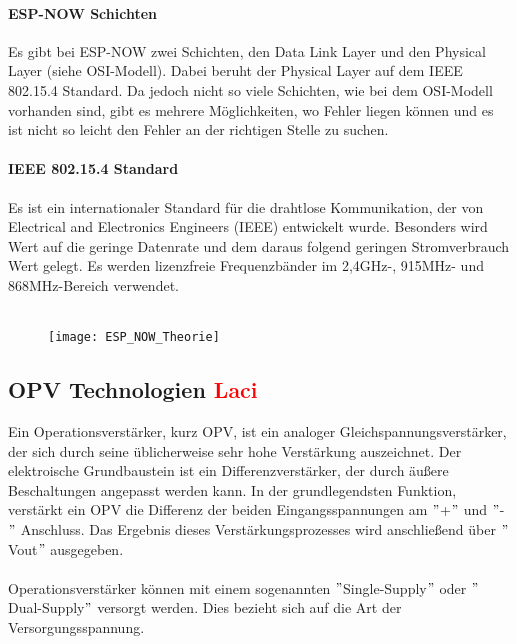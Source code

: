 \documentclass[titlepage,12pt,twoside]{article}
\begin{document}
\paragraph{ESP-NOW Schichten}
\hfill \break
\hfill \break
Es gibt bei ESP-NOW zwei Schichten, den Data Link Layer und den Physical Layer 
(siehe OSI-Modell). Dabei beruht der Physical Layer auf dem IEEE 802.15.4 Standard. 
Da jedoch nicht so viele Schichten, wie bei dem OSI-Modell vorhanden sind, gibt es 
mehrere Möglichkeiten, wo Fehler liegen können und es ist nicht so leicht den Fehler 
an der richtigen Stelle zu suchen. \\

\paragraph{IEEE 802.15.4 Standard}
\hfill \break
\hfill \break
Es ist ein internationaler Standard für die drahtlose Kommunikation, der von 
Electrical and Electronics Engineers (IEEE) entwickelt wurde. Besonders wird Wert auf 
die geringe Datenrate und dem daraus folgend geringen Stromverbrauch Wert gelegt. Es 
werden lizenzfreie Frequenzbänder im 2,4GHz-, 915MHz- und 868MHz-Bereich verwendet. \\
\\
\begin{figure}[H]
	\begin{center}
		\scalebox{0.8}
		{\texttt{[image: ESP\_NOW\_Theorie]}}
	\end{center}
\end{figure}
\hfill \break

\subsection{OPV Technologien \textcolor{red}{Laci}}
Ein Operationsverstärker, kurz OPV, ist ein analoger Gleichspannungsverstärker, der sich durch seine üblicherweise sehr hohe 
Verstärkung auszeichnet. Der elektroische Grundbaustein ist ein Differenzverstärker, der durch äußere Beschaltungen angepasst werden kann.
In der grundlegendsten Funktion, verstärkt ein OPV die Differenz der beiden Eingangsspannungen am $"$+$"$ und $"$-$"$ Anschluss. Das Ergebnis
dieses Verstärkungsprozesses wird anschließend über $"$Vout$"$ ausgegeben. \\
\\
Operationsverstärker können mit einem sogenannten $"$Single-Supply$"$ oder $"$Dual-Supply$"$ versorgt werden. Dies bezieht sich auf
die Art der Versorgungsspannung. \\
\\
\end{document}
